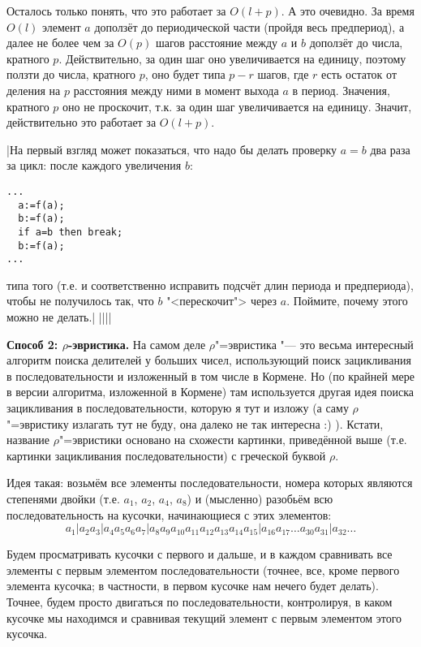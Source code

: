 Осталось только понять, что это работает за $O(l+p)$. А это очевидно. За время $O(l)$ элемент 
$a$ доползёт до периодической части (пройдя весь предпериод), а далее не более чем за $O(p)$ 
шагов расстояние между $a$ и $b$ доползёт до числа, кратного $p$. Действительно, за один шаг оно 
увеличивается на единицу, поэтому ползти до числа, кратного $p$, оно будет типа $p-r$ шагов, 
где $r$ есть остаток от деления на $p$ расстояния между ними в момент выхода $a$ в период. 
Значения, кратного $p$ оно не проскочит, т.к. за один шаг увеличивается на единицу.
Значит, действительно это работает за $O(l+p)$.

\task|На первый взгляд может показаться, что надо бы делать проверку $a=b$ два 
раза за цикл: после каждого увеличения $b$:
\begin{codesampleo}\begin{verbatim}
...
  a:=f(a);
  b:=f(a);
  if a=b then break;
  b:=f(a);
...
\end{verbatim}
\end{codesampleo}
типа того (т.е. и соответственно исправить подсчёт длин периода и предпериода), чтобы не получилось 
так, что $b$ "<перескочит"> через $a$. Поймите, почему этого можно не делать.|
||||

\textbf{Способ 2: $\rho$-эвристика.} На самом деле $\rho$"=эвристика "--- это весьма интересный 
алгоритм поиска делителей у больших чисел, использующий поиск зацикливания в 
последовательности и изложенный в том числе в Кормене. Но (по крайней мере в версии алгоритма, 
изложенной в Кормене) там используется другая идея поиска зацикливания в последовательности, 
которую я тут и изложу (а саму $\rho$"=эвристику излагать тут не буду, она далеко не так 
интересна :) ). Кстати, название $\rho$"=эвристики основано на схожести картинки, приведённой 
выше (т.е. картинки зацикливания последовательности) с греческой буквой $\rho$.

Идея такая: возьмём все элементы последовательности, номера которых являются степенями двойки 
(т.е. $a_1$, $a_2$, $a_4$, $a_8$) и (мысленно) разобьём всю последовательность на кусочки, начинающиеся с 
этих элементов:
$$
a_1 | a_2 a_3 | a_4 a_5 a_6 a_7 | a_8 a_9 a_{10} a_{11} a_{12} a_{13} a_{14} a_{15} | 
a_{16} a_{17} \dots a_{30} a_{31} | a_{32} \dots
$$

Будем просматривать кусочки с первого и дальше, и в каждом сравнивать все элементы с первым 
элементом последовательности (точнее, все, кроме первого элемента кусочка; в частности, в первом кусочке нам нечего будет 
делать). Точнее, будем просто двигаться по последовательности, контролируя, в каком кусочке мы 
находимся и сравнивая текущий элемент с первым элементом этого кусочка.

